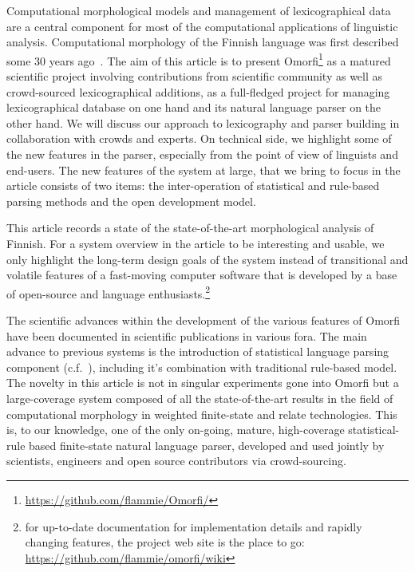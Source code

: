 \documentclass[preprint]{flammie}
\begin{document}
Computational morphological models and management of lexicographical data
are a central component for most of the computational applications of
linguistic analysis. Computational morphology of the Finnish language was
first described some 30 years ago~\citep{koskenniemi1983twolevel}. The aim
of this article is to present Omorfi\footnote{
\url{https://github.com/flammie/Omorfi/}} as a matured scientific project
involving contributions from scientific community as well as crowd-sourced
lexicographical additions, as a full-fledged project for managing
lexicographical database on one hand and its natural language parser on the
other hand.  We will discuss our approach to lexicography and parser
building in collaboration with crowds and experts. On technical side, we
highlight some of the new features in the parser, especially from the point
of view of linguists and end-users. The new features of the system at large,
that we bring to focus in the article consists of two items: the
inter-operation of statistical and rule-based parsing methods and the open
development model.

This article records a state of the state-of-the-art morphological analysis
of Finnish. For a system overview in the article to be interesting and
usable, we only highlight the long-term design goals of the system instead
of transitional and volatile features of a fast-moving computer software
that is developed by a base of open-source and language
enthusiasts.\footnote{for up-to-date documentation for implementation
    details and rapidly changing features, the project web site is the place
to go: \url{https://github.com/flammie/omorfi/wiki}}

The scientific advances within the development of the various features of
Omorfi have been documented in scientific publications in various fora. The
main advance to previous systems is the introduction of statistical language
parsing component (c.f.~\citet{manning1999foundations}), including it's combination with
traditional rule-based model. The novelty in this article is not in singular
experiments gone into Omorfi but a large-coverage system composed of all the
state-of-the-art results in the field of computational morphology in
weighted finite-state and relate technologies. This is, to our knowledge,
one of the only on-going, mature, high-coverage statistical-rule based
finite-state natural language parser, developed and used jointly by
scientists, engineers and open source contributors via crowd-sourcing.
\end{document}
